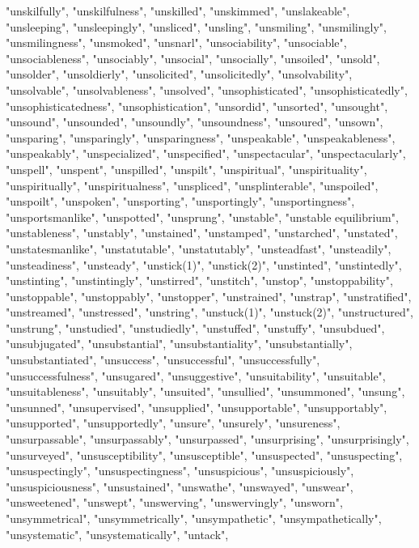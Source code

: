 "unskilfully",
"unskilfulness",
"unskilled",
"unskimmed",
"unslakeable",
"unsleeping",
"unsleepingly",
"unsliced",
"unsling",
"unsmiling",
"unsmilingly",
"unsmilingness",
"unsmoked",
"unsnarl",
"unsociability",
"unsociable",
"unsociableness",
"unsociably",
"unsocial",
"unsocially",
"unsoiled",
"unsold",
"unsolder",
"unsoldierly",
"unsolicited",
"unsolicitedly",
"unsolvability",
"unsolvable",
"unsolvableness",
"unsolved",
"unsophisticated",
"unsophisticatedly",
"unsophisticatedness",
"unsophistication",
"unsordid",
"unsorted",
"unsought",
"unsound",
"unsounded",
"unsoundly",
"unsoundness",
"unsoured",
"unsown",
"unsparing",
"unsparingly",
"unsparingness",
"unspeakable",
"unspeakableness",
"unspeakably",
"unspecialized",
"unspecified",
"unspectacular",
"unspectacularly",
"unspell",
"unspent",
"unspilled",
"unspilt",
"unspiritual",
"unspirituality",
"unspiritually",
"unspiritualness",
"unspliced",
"unsplinterable",
"unspoiled",
"unspoilt",
"unspoken",
"unsporting",
"unsportingly",
"unsportingness",
"unsportsmanlike",
"unspotted",
"unsprung",
"unstable",
"unstable equilibrium",
"unstableness",
"unstably",
"unstained",
"unstamped",
"unstarched",
"unstated",
"unstatesmanlike",
"unstatutable",
"unstatutably",
"unsteadfast",
"unsteadily",
"unsteadiness",
"unsteady",
"unstick(1)",
"unstick(2)",
"unstinted",
"unstintedly",
"unstinting",
"unstintingly",
"unstirred",
"unstitch",
"unstop",
"unstoppability",
"unstoppable",
"unstoppably",
"unstopper",
"unstrained",
"unstrap",
"unstratified",
"unstreamed",
"unstressed",
"unstring",
"unstuck(1)",
"unstuck(2)",
"unstructured",
"unstrung",
"unstudied",
"unstudiedly",
"unstuffed",
"unstuffy",
"unsubdued",
"unsubjugated",
"unsubstantial",
"unsubstantiality",
"unsubstantially",
"unsubstantiated",
"unsuccess",
"unsuccessful",
"unsuccessfully",
"unsuccessfulness",
"unsugared",
"unsuggestive",
"unsuitability",
"unsuitable",
"unsuitableness",
"unsuitably",
"unsuited",
"unsullied",
"unsummoned",
"unsung",
"unsunned",
"unsupervised",
"unsupplied",
"unsupportable",
"unsupportably",
"unsupported",
"unsupportedly",
"unsure",
"unsurely",
"unsureness",
"unsurpassable",
"unsurpassably",
"unsurpassed",
"unsurprising",
"unsurprisingly",
"unsurveyed",
"unsusceptibility",
"unsusceptible",
"unsuspected",
"unsuspecting",
"unsuspectingly",
"unsuspectingness",
"unsuspicious",
"unsuspiciously",
"unsuspiciousness",
"unsustained",
"unswathe",
"unswayed",
"unswear",
"unsweetened",
"unswept",
"unswerving",
"unswervingly",
"unsworn",
"unsymmetrical",
"unsymmetrically",
"unsympathetic",
"unsympathetically",
"unsystematic",
"unsystematically",
"untack",
